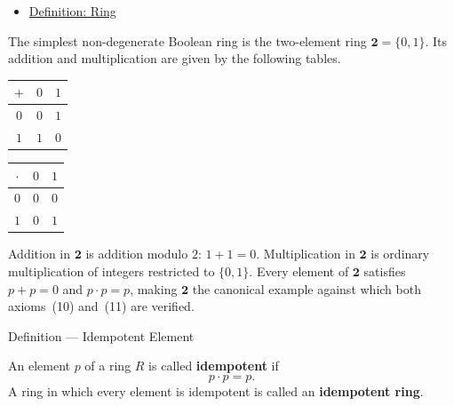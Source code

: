 \begin{dependencies}
\begin{itemize}
  \item \hyperref[def:algebraic-ring]{Definition: Ring}
\end{itemize}
\end{dependencies}




\begin{example*}
The simplest non-degenerate Boolean ring is the two-element ring
$\mathbf{2} = \{0, 1\}$.
Its addition and multiplication are given by the following tables.

\begin{center}
\begin{tabular}{c|cc}
$+$ & $0$ & $1$ \\ \hline
$0$ & $0$ & $1$ \\
$1$ & $1$ & $0$
\end{tabular}
\qquad\qquad
\begin{tabular}{c|cc}
$\cdot$ & $0$ & $1$ \\ \hline
$0$ & $0$ & $0$ \\
$1$ & $0$ & $1$
\end{tabular}
\end{center}

\noindent
Addition in $\mathbf{2}$ is addition modulo $2$: $1 + 1 = 0$.
Multiplication in $\mathbf{2}$ is ordinary multiplication of
integers restricted to $\{0, 1\}$.
Every element of $\mathbf{2}$ satisfies $p + p = 0$ and
$p \cdot p = p$, making $\mathbf{2}$ the canonical example against
which both axioms~(10) and~(11) are verified.
\end{example*}


\begin{definitionbox}{Definition --- Idempotent Element}
\begin{definition}
\label{def:idempotent-element}
An element $p$ of a ring $R$ is called \textbf{idempotent} if
\[
p \cdot p = p.
\]
A ring in which every element is idempotent is called an
\textbf{idempotent ring}.
\end{definition}
\end{definitionbox}

